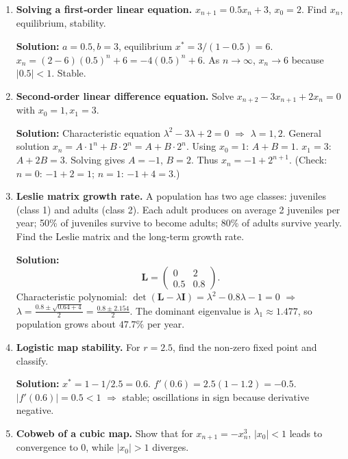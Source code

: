 \documentclass[12pt,a4paper]{book}
\begin{document}
\begin{enumerate}[leftmargin=*, label=\textbf{Example 2.\arabic*}]
    \item \textbf{Solving a first‑order linear equation.}
    $x_{n+1} = 0.5 x_n + 3$, $x_0 = 2$. Find $x_n$, equilibrium, stability.

    \textbf{Solution:} $a=0.5, b=3$, equilibrium $x^* = 3/(1-0.5)=6$.
    $x_n = (2-6)(0.5)^n + 6 = -4(0.5)^n + 6$.
    As $n\to\infty$, $x_n \to 6$ because $|0.5|<1$. Stable.

    \item \textbf{Second‑order linear difference equation.}
    Solve $x_{n+2} - 3 x_{n+1} + 2 x_n = 0$ with $x_0=1, x_1=3$.

    \textbf{Solution:} Characteristic equation $\lambda^2 -3\lambda +2 =0$ $\Rightarrow$ $\lambda=1,2$.
    General solution $x_n = A\cdot 1^n + B\cdot 2^n = A + B\cdot 2^n$.
    Using $x_0=1$: $A+B=1$. $x_1=3$: $A+2B=3$. Solving gives $A=-1$, $B=2$. Thus $x_n = -1 + 2^{n+1}$. (Check: $n=0$: $-1+2=1$; $n=1$: $-1+4=3$.)

    \item \textbf{Leslie matrix growth rate.}
    A population has two age classes: juveniles (class 1) and adults (class 2). Each adult produces on average 2 juveniles per year; 50\% of juveniles survive to become adults; 80\% of adults survive yearly. Find the Leslie matrix and the long‑term growth rate.

    \textbf{Solution:}
    \[
    \mathbf{L} = \begin{pmatrix} 0 & 2 \\ 0.5 & 0.8 \end{pmatrix}.
    \]
    Characteristic polynomial: $\det(\mathbf{L} - \lambda \mathbf{I}) = \lambda^2 - 0.8\lambda - 1 = 0$ $\Rightarrow$ $\lambda = \frac{0.8 \pm \sqrt{0.64+4}}{2} = \frac{0.8 \pm 2.154}{2}$.
    The dominant eigenvalue is $\lambda_1 \approx 1.477$, so population grows about $47.7\%$ per year.

    \item \textbf{Logistic map stability.}
    For $r=2.5$, find the non‑zero fixed point and classify.

    \textbf{Solution:} $x^* = 1 - 1/2.5 = 0.6$. $f'(0.6) = 2.5(1-1.2) = -0.5$. $|f'(0.6)|=0.5<1$ $\Rightarrow$ stable; oscillations in sign because derivative negative.

    \item \textbf{Cobweb of a cubic map.}
    Show that for $x_{n+1} = -x_n^3$, $|x_0|<1$ leads to convergence to $0$, while $|x_0|>1$ diverges.


\end{enumerate}
\end{document}
